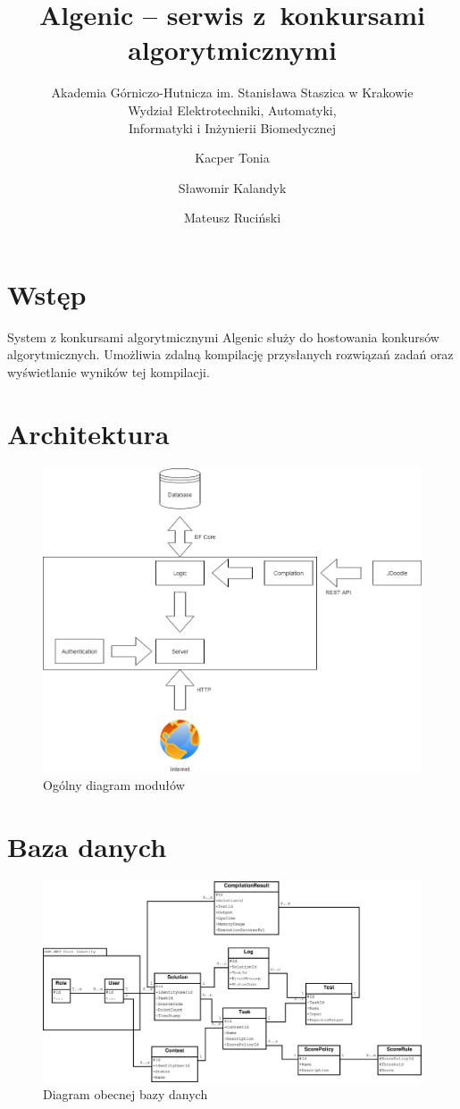 \documentclass{article}
\title{Algenic -- serwis z~konkursami algorytmicznymi}
\subtitle{Akademia Górniczo-Hutnicza im. Stanisława Staszica w Krakowie\\
	Wydział Elektrotechniki, Automatyki,\\
	Informatyki i Inżynierii Biomedycznej}
\author{Kacper Tonia\and
		Sławomir Kalandyk\and
		Mateusz Ruciński}
\date{}
\begin{document}
\maketitle
\section{Wstęp}
System z konkursami algorytmicznymi Algenic służy do hostowania konkursów algorytmicznych. Umożliwia zdalną kompilację przysłanych rozwiązań zadań oraz wyświetlanie wyników tej kompilacji.

\section{Architektura}

\begin{figure}[H]
	\centering
	\includegraphics[width=\linewidth]{project_modules.png}
	\caption{Ogólny diagram modułów}
\end{figure}

\section{Baza danych}
\begin{figure}[H]
	\includegraphics[width=\linewidth]{entityDiagram.eps}
	\caption{Diagram obecnej bazy danych}
\end{figure}
\end{document}
